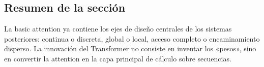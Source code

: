 \subsection{Resumen de la sección}

La basic attention ya contiene los ejes de diseño centrales de los sistemas posteriores: continua o discreta, global o local, acceso completo o encaminamiento disperso. La innovación del Transformer no consiste en inventar los «pesos», sino en convertir la attention en la capa principal de cálculo sobre secuencias.
